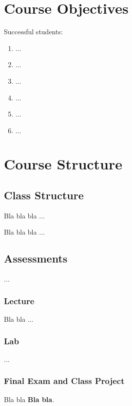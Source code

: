 \documentclass[11pt]{article}
\begin{document}

\section*{Course Objectives}
Successful students:
\begin{enumerate}
\item ...
\item ...
\item ...
\item ...
\item ...
\item ...
\end{enumerate}


\section*{Course Structure}

\subsection*{Class Structure}

Bla bla bla ...

\bigskip

Bla bla bla ...

\subsection*{Assessments}

...

\subsubsection*{Lecture}
Bla bla ...

\subsubsection*{Lab}
...

\subsubsection*{Final Exam and Class Project}

Bla bla \textbf{Bla bla}.
\end{document}
